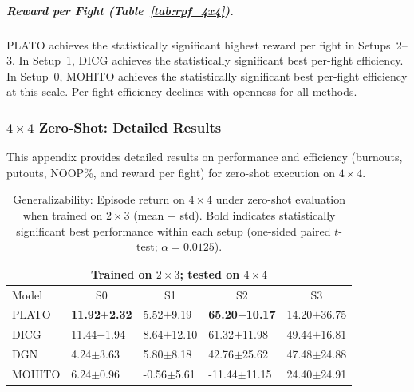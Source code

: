 \subparagraph{Reward per Fight (Table~\ref{tab:rpf_4x4}).}
PLATO achieves the statistically significant highest reward per fight in Setups~2--3. In Setup~1, DICG achieves the statistically significant best per-fight efficiency. In Setup~0, MOHITO achieves the statistically significant best per-fight efficiency at this scale. Per-fight efficiency declines with openness for all methods.

\subsubsection{$4\times 4$ Zero-Shot: Detailed Results}\label{sec:zeroshot_appendix}

This appendix provides detailed results on performance and efficiency (burnouts, putouts, NOOP\%, and reward per fight) for zero-shot execution on $4\times 4$.
\begin{table}[t]
\centering
\small
\setlength{\tabcolsep}{2.6pt}
\renewcommand{\arraystretch}{1.03}
\begin{tabular}{l|l|l|l|l}
\toprule
\multicolumn{5}{c}{Trained on $2\times 3$; tested on $4\times 4$} \\
\midrule
Model  & \multicolumn{1}{c|}{S0} & \multicolumn{1}{c|}{S1} & \multicolumn{1}{c|}{S2} & \multicolumn{1}{c}{S3} \\
\midrule
PLATO & \textbf{11.92$\pm$2.32} & 5.52$\pm$9.19 & \textbf{65.20$\pm$10.17} & 14.20$\pm$36.75 \\
DICG & 11.44$\pm$1.94 & 8.64$\pm$12.10 & 61.32$\pm$11.98 & 49.44$\pm$16.81 \\
DGN & 4.24$\pm$3.63 & 5.80$\pm$8.18 & 42.76$\pm$25.62 & 47.48$\pm$24.88 \\
MOHITO  & 6.24$\pm$0.96 & -0.56$\pm$5.61 & -11.44$\pm$11.15 & 24.40$\pm$24.91 \\


\bottomrule
\end{tabular}
\caption{Generalizability: Episode return on $4\times 4$ under zero-shot evaluation when trained on $2\times 3$ (mean $\pm$ std). Bold indicates statistically significant best performance within each setup (one-sided paired $t$-test; $\alpha=0.0125$).}
\label{tab:cross_4x4_reward_from_2x3_full}
\end{table}


